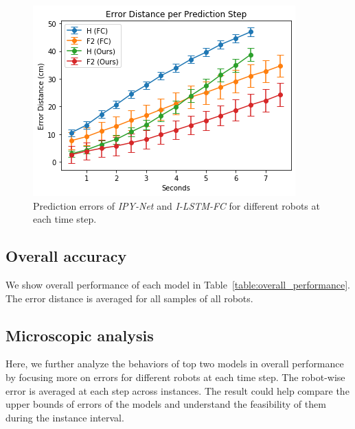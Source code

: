 \documentclass[letterpaper, 10 pt, conference]{ieeeconf}  %
\begin{document}
	
	

	\begin{figure}[t]
		\centering
		\includegraphics[width=1.\columnwidth]{fig_micro_eval}
		\caption{Prediction errors of \emph{IPY-Net} and \emph{I-LSTM-FC} 
			for different robots at each time step.  
		}
		\label{fig:micro_eval}
	\end{figure}

	
	\subsection{Overall accuracy}
	\label{sec:overall_performance}
	
	We show overall performance of each model in Table~\ref{table:overall_performance}. 
	The error distance is averaged for all samples of all robots. 

	
	\subsection{Microscopic analysis}
	\label{sec:microscopic_analysis}
	
	Here, we further analyze the behaviors of top two models in overall performance 
	by focusing more on errors for different robots at each time step. 
	The robot-wise error is averaged at each step across instances. 
	The result could help compare the upper bounds of errors of the models and 
	understand the feasibility of them during the instance interval. 
\end{document}
